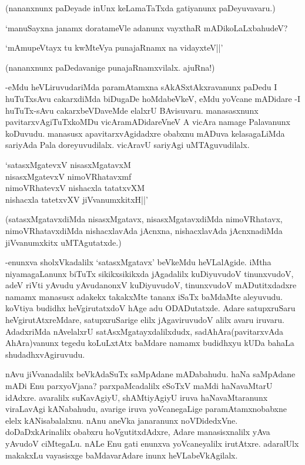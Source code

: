 (nananxnunx paDeyade inUnx keLamaTaTxda gatiyanunx paDeyuvavaru.)

`manuSayxna janamx doratameVle adanunx vayxthaR mADikoLaLxbahudeV?

\begin{shloka}
`mAmupeVtayx tu kwMteVya punajaRnamx na vidayxteV||'
\end{shloka}

(nananxnunx paDedavanige punajaRnamxvilalx. ajuRna!)

-eMdu heVLiruvudariMda paramAtamxna sAkASxtAkxravanunx paDedu I huTuTxsAvu cakarxdiMda biDugaDe hoMdabeVkeV, eMdu yoVcane mADidare -I huTuTx-sAvu cakarxbeVDaveMde elalxrU BAvisuvaru. manasasxnunx pavitarxvAgiTuTxkoMDu vicAramADidareVneV A vicAra namage Palavanunx koDuvudu. manasusx apavitarxvAgidadxre obabxnu mADuva kelasagaLiMda sariyAda Pala doreyuvudilalx. vicAravU sariyAgi uMTAguvudilalx.

\begin{shloka}
`satasxMgatevxV nisasxMgatavxM\\
nisasxMgatevxV nimoVRhatavxmf\\
nimoVRhatevxV nishacxla tatatxvXM\\
nishacxla tatetxvXV jiVvanumxkitxH||'
\end{shloka}

(satasxMgatavxdiMda nisasxMgatavx, nisasxMgatavxdiMda nimoVRhatavx, nimoVRhatavxdiMda nishacxlavAda jAcnxna, nishacxlavAda jAcnxnadiMda jiVvanumxkitx uMTAgutatxde.)

-enunxva sholxVkadalilx `satasxMgatavx' beVkeMdu heVLalAgide. iMtha niyamagaLanunx biTuTx sikikxsikikxda jAgadalilx kuDiyuvudoV tinunxvudoV, adeV riVti yAvudu yAvudanonxV kuDiyuvudoV, tinunxvudoV mADutitxdadxre namamx manasusx adakekx takakxMte tananx iSaTx baMdaMte aleyuvudu. koVtiya budidhx heVgirutatxdoV hAge adu ODADutatxde. Adare satupxruSaru heVgirutAtxreMdare, satupxruSarige elilx jAgaviruvudoV alilx avaru iruvaru. AdadxriMda nAvelalxrU satAsxMgatayxdalilxdudx, sadAhAra(pavitarxvAda AhAra)vanunx tegedu koLuLxtAtx baMdare namamx budidhxyu kUDa bahaLa shudadhxvAgiruvudu.

nAvu jiVvanadalilx beVkAdaSuTx saMpAdane mADabahudu. haNa saMpAdane mADi Enu parxyoVjana? parxpaMcadalilx eSoTxV maMdi haNavaMtarU idAdxre. avaralilx suKavAgiyU, shAMtiyAgiyU iruva haNavaMtaranunx viraLavAgi kANabahudu, avarige iruva yoVcanegaLige paramAtamxnobabxne elelx kANisabalalxnu. nAnu aneVka janaranunx noVDidedxVne. doDaDxkArinalilx obabxru hoVgutitxdAdxre, Adare manasisxnalilx yAva yAvudoV ciMtegaLu. nALe Enu gati enunxva yoVcaneyalilx irutAtxre. adaralUlx makakxLu vayasisxge baMdavarAdare inunx heVLabeVkAgilalx.

